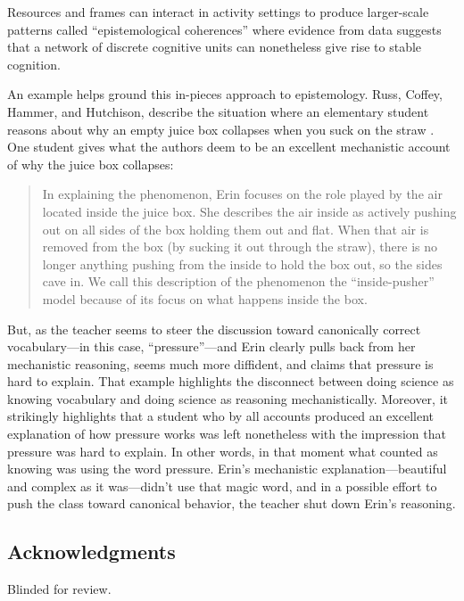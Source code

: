 Resources and frames can interact in activity settings to produce
larger-scale patterns called ``epistemological coherences'' \cite{rosenberg_multiple_2006} where evidence from data suggests that a
network of discrete cognitive units can nonetheless give rise to stable
cognition.

An example helps ground this in-pieces approach to epistemology. Russ, Coffey, Hammer, and Hutchison, describe the
situation where an elementary student reasons about why an empty juice
box collapses when you suck on the straw \cite{russ_making_2008}. One student gives what the
authors deem to be an excellent mechanistic account of why the juice box
collapses:

\begin{quote}
  In explaining the phenomenon, Erin focuses on the role played by the air located inside the juice box. She describes the air inside as actively pushing out on all sides of the box holding them out and flat. When that air is removed from the box (by sucking it out through the straw), there is no longer anything pushing from the inside to hold the box out, so the sides cave in. We call this description of the phenomenon the “inside-pusher” model because of its focus on what happens inside the box. \cite{russ_making_2008}
\end{quote}

But, as the teacher seems to steer the discussion toward canonically correct
vocabulary---in this case, ``pressure''---and Erin clearly pulls back
from her mechanistic reasoning, seems much more diffident, and claims
that pressure is hard to explain. That example highlights the disconnect
between doing science as knowing vocabulary and doing science as
reasoning mechanistically. Moreover, it strikingly highlights that a
student who by all accounts produced an excellent explanation of how
pressure works was left nonetheless with the impression that pressure
was hard to explain. In other words, in that moment what counted as knowing was using the word pressure. Erin's mechanistic explanation---beautiful and complex as it was---didn't use that magic word, and in a possible effort to push the class toward canonical behavior, the teacher shut down Erin's reasoning.

\subsection{Acknowledgments}\label{acknowledgments}

Blinded for review.

\clearpage



